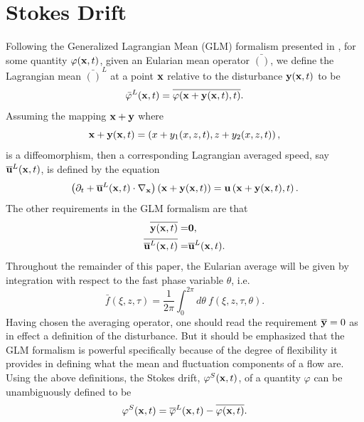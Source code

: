 \documentclass[a4paper,11pt]{article}
\newcommand{\p}{\partial}
\begin{document}
\section{Stokes Drift}
Following the Generalized Lagrangian Mean (GLM) formalism presented in
\cite{andrews}, for some quantity $\varphi({\bf x},t)$, given an
Eularian mean operator $\bar{()}$, we define the Lagrangian mean
$\bar{()}^{L}$ at a point ${\bf x}$ relative to the disturbance ${\bf
  y}({\bf x},t)$ to be  
\[
\bar{\varphi}^{L}({\bf x},t) = \overline{\varphi({\bf x}+{\bf y}({\bf x},t),t)}.
\]
Assuming the mapping ${\bf x} + {\bf y}$ where
\[
{\bf x} + {\bf y}({\bf x},t) = \left(x+y_{1}(x,z,t),z+y_{2}(x,z,t)\right),
\]
is a diffeomorphism, then a corresponding Lagrangian averaged speed, say $\overline{{\bf u}}^{L}({\bf x},t)$, is defined by the equation
\begin{equation}
\left(\p_{t} + \overline{{\bf u}}^{L}({\bf x},t)\cdot \nabla_{{\bf x}} \right) \left({\bf x} + {\bf y}({\bf x},t)\right) = {\bf u}\left({\bf x} + {\bf y}({\bf x},t),t\right).
\label{speeddef}
\end{equation}
The other requirements in the GLM formalism are that 
\begin{align*}
\overline{{\bf y}({\bf x},t)} = & \bf{0}, \\
\overline{\overline{{\bf u}}^{L}({\bf x},t)} = & \overline{{\bf u}}^{L}({\bf x},t).
\end{align*}
Throughout the remainder of this paper, the Eularian average will be
given by integration with respect to the fast phase variable $\theta$,
i.e.  
\[
\bar{f}(\xi,z,\tau) = \frac{1}{2\pi}\int_{0}^{2\pi} d\theta~ f(\xi,z,\tau,\theta).
\]
Having chosen the averaging operator, one should read the requirement $\overline{{\bf y}}=0$ as in effect a definition of the disturbance.  But it should be emphasized that the GLM formalism is powerful specifically because of the degree of flexibility it provides in defining what the mean and fluctuation components of a flow are.   Using the above definitions, the Stokes drift, $\varphi^{S}({\bf x},t)$, of a quantity $\varphi$ can be unambiguously defined to be 
\[
\varphi^{S}({\bf x},t) = \overline{\varphi}^{L}({\bf x},t) - \overline{\varphi({\bf x},t)}. 
\]
\end{document}
